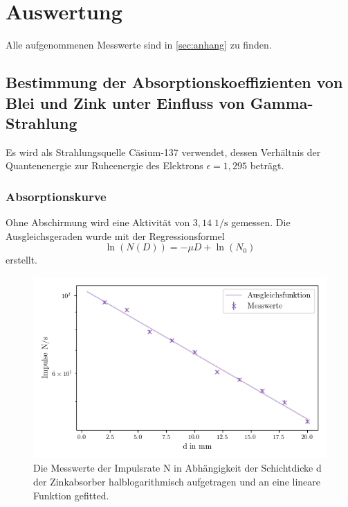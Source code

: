 \section{Auswertung}
\label{sec:Auswertung}
Alle aufgenommenen Messwerte sind in \autoref{sec:anhang} zu finden.
\subsection{Bestimmung der Absorptionskoeffizienten von Blei und Zink unter Einfluss
von Gamma-Strahlung}

Es wird als Strahlungsquelle Cäsium-137 verwendet, dessen Verhältnis der 
Quantenenergie zur Ruheenergie des Elektrons $\epsilon = 1,295$ beträgt.\\

\subsubsection*{Absorptionskurve}
Ohne Abschirmung wird eine Aktivität von $3,14 \; \mathrm{1/s}$ gemessen.
Die Ausgleichsgeraden wurde mit der Regressionsformel 
\begin{equation*}
  \mathrm{\ln}(N(D)) = - \mu D + \mathrm{\ln}(N_0)
  \label{eq:linreg}
\end{equation*}
erstellt.\\
\begin{figure}[H]
  \centering
  \includegraphics{content/verzweiflung.png}
  \caption{Die Messwerte der Impulsrate N in Abhängigkeit der 
  Schichtdicke d der Zinkabsorber halblogarithmisch aufgetragen und an eine lineare Funktion gefitted.}
  \label{fig:verzweiflung}
\end{figure}
